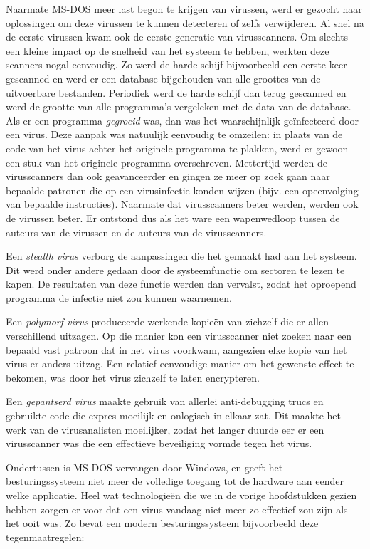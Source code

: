 Naarmate MS-DOS meer last begon te krijgen van virussen, werd er gezocht naar oplossingen om deze virussen te kunnen detecteren of zelfs verwijderen. Al snel na de eerste virussen kwam ook de eerste generatie van virusscanners. Om slechts een kleine impact op de snelheid van het systeem te hebben, werkten deze scanners nogal eenvoudig. Zo werd de harde schijf bijvoorbeeld een eerste keer gescanned en werd er een database bijgehouden van alle groottes van de uitvoerbare bestanden. Periodiek werd de harde schijf dan terug gescanned en werd de grootte van alle programma's vergeleken met de data van de database. Als er een programma \emph{gegroeid} was, dan was het waarschijnlijk ge\"infecteerd door een virus. Deze aanpak was natuulijk eenvoudig te omzeilen: in plaats van de code van het virus achter het originele programma te plakken, werd er gewoon een stuk van het originele programma overschreven. Mettertijd werden de virusscanners dan ook geavanceerder en gingen ze meer op zoek gaan naar bepaalde patronen die op een virusinfectie konden wijzen (bijv. een opeenvolging van bepaalde instructies). Naarmate dat virusscanners beter werden, werden ook de virussen beter. Er ontstond dus als het ware een wapenwedloop tussen de auteurs van de virussen en de auteurs van de virusscanners.

Een \emph{stealth virus} verborg de aanpassingen die het gemaakt had aan het systeem. Dit werd onder andere gedaan door de systeemfunctie om sectoren te lezen te kapen. De resultaten van deze functie werden dan vervalst, zodat het oproepend programma de infectie niet zou kunnen waarnemen.

Een \emph{polymorf virus} produceerde werkende kopie\"en van zichzelf die er allen verschillend uitzagen. Op die manier kon een virusscanner niet zoeken naar een bepaald vast patroon dat in het virus voorkwam, aangezien elke kopie van het virus er anders uitzag. Een relatief eenvoudige manier om het gewenste effect te bekomen, was door het virus zichzelf te laten encrypteren.

Een \emph{gepantserd virus} maakte gebruik van allerlei anti-debugging trucs en gebruikte code die expres moeilijk en onlogisch in elkaar zat. Dit maakte het werk van de virusanalisten moeilijker, zodat het langer duurde eer er een virusscanner was die een effectieve beveiliging vormde tegen het virus.

Ondertussen is MS-DOS vervangen door Windows, en geeft het besturingssysteem niet meer de volledige toegang tot de hardware aan eender welke applicatie. Heel wat technologie\"en die we in de vorige hoofdstukken gezien hebben zorgen er voor dat een virus vandaag niet meer zo effectief zou zijn als het ooit was. Zo bevat een modern besturingssysteem bijvoorbeeld deze tegenmaatregelen:

